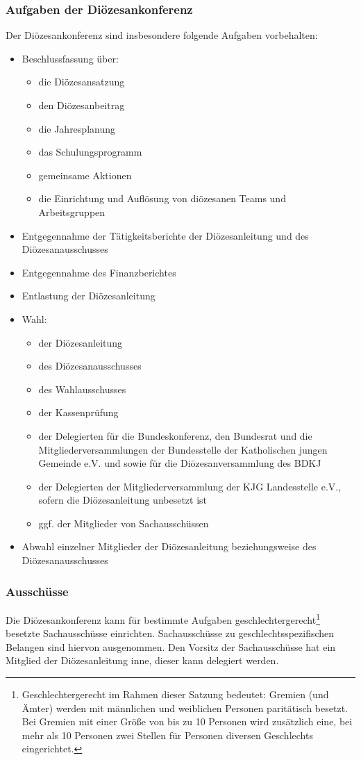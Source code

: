 \documentclass[12pt]{report}
\begin{document}
\begin{flushleft}
\subsubsection{Aufgaben der Diözesankonferenz}
Der Diözesankonferenz sind insbesondere folgende Aufgaben vorbehalten:
\begin{itemize}	
  \item Beschlussfassung über:
    \begin{itemize} 
      \item die Diözesansatzung
      \item den Diözesanbeitrag
      \item die Jahresplanung
      \item das Schulungsprogramm
      \item gemeinsame Aktionen
      \item die Einrichtung und Auflösung von diözesanen Teams und Arbeitsgruppen
    \end{itemize}
  \item Entgegennahme der Tätigkeitsberichte der Diözesanleitung und des Diözesanausschusses
  \item Entgegennahme des Finanzberichtes
  \item Entlastung der Diözesanleitung
  \item Wahl:
    \begin{itemize}
      \item der Diözesanleitung
      \item des Diözesanausschusses
      \item des Wahlausschusses
      \item der Kassenprüfung
      \item der Delegierten für die Bundeskonferenz, den Bundesrat und die 
            Mitgliederversammlungen der Bundesstelle der Katholischen jungen Gemeinde e.V. und sowie für die
            Diözesanversammlung des BDKJ
      \item der Delegierten der Mitgliederversammlung der KJG Landesstelle e.V., sofern die Diözesanleitung
            unbesetzt ist
      \item ggf. der Mitglieder von Sachausschüssen
    \end{itemize}
  \item Abwahl einzelner Mitglieder der Diözesanleitung beziehungsweise des Diözesanausschusses
\end{itemize}
\subsubsection{Ausschüsse}
Die Diözesankonferenz kann für bestimmte Aufgaben geschlechtergerecht\footnote{Geschlechtergerecht im Rahmen dieser Satzung bedeutet: Gremien (und Ämter) werden mit männlichen und
weiblichen Personen paritätisch besetzt. Bei Gremien mit einer Größe von bis zu 10 Personen wird zusätzlich
eine, bei mehr als 10 Personen zwei Stellen für Personen diversen Geschlechts eingerichtet.} besetzte Sachausschüsse einrichten.
Sachausschüsse zu geschlechtsspezifischen Belangen sind hiervon ausgenommen.
Den Vorsitz der Sachausschüsse hat ein Mitglied der Diözesanleitung inne, dieser kann delegiert
werden.


\end{flushleft}
\end{document}
